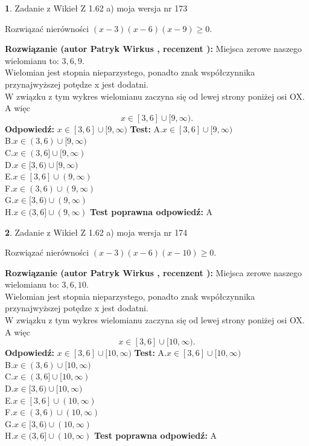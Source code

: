 \documentclass[12pt, a4paper]{article}
\theoremstyle{definition} %
\newtheorem{zad}{}
\newcommand{\zadStart}[1]{\begin{zad}#1\newline}
\newcommand{\zadStop}{\end{zad}}
\newcommand{\rozwStart}[2]{\noindent \textbf{Rozwiązanie (autor #1 , recenzent #2): }\newline}
\newcommand{\rozwStop}{\newline}
\newcommand{\odpStart}{\noindent \textbf{Odpowiedź:}\newline}
\newcommand{\odpStop}{\newline}
\newcommand{\testStart}{\noindent \textbf{Test:}\newline}
\newcommand{\testStop}{\newline}
\newcommand{\kluczStart}{\noindent \textbf{Test poprawna odpowiedź:}\newline}
\newcommand{\kluczStop}{\newline}
\begin{document}
\zadStart{Zadanie z Wikieł Z 1.62 a) moja wersja nr 173}

Rozwiązać nierówności $(x-3)(x-6)(x-9)\ge0$.
\zadStop
\rozwStart{Patryk Wirkus}{}
Miejsca zerowe naszego wielomianu to: $3, 6, 9$.\\
Wielomian jest stopnia nieparzystego, ponadto znak współczynnika przy\linebreak najwyższej potędze x jest dodatni.\\ W związku z tym wykres wielomianu zaczyna się od lewej strony poniżej osi OX. A więc $$x \in [3,6] \cup [9,\infty).$$
\rozwStop
\odpStart
$x \in [3,6] \cup [9,\infty)$
\odpStop
\testStart
A.$x \in [3,6] \cup [9,\infty)$\\
B.$x \in (3,6) \cup [9,\infty)$\\
C.$x \in (3,6] \cup [9,\infty)$\\
D.$x \in [3,6) \cup [9,\infty)$\\
E.$x \in [3,6] \cup (9,\infty)$\\
F.$x \in (3,6) \cup (9,\infty)$\\
G.$x \in [3,6) \cup (9,\infty)$\\
H.$x \in (3,6] \cup (9,\infty)$
\testStop
\kluczStart
A
\kluczStop



\zadStart{Zadanie z Wikieł Z 1.62 a) moja wersja nr 174}

Rozwiązać nierówności $(x-3)(x-6)(x-10)\ge0$.
\zadStop
\rozwStart{Patryk Wirkus}{}
Miejsca zerowe naszego wielomianu to: $3, 6, 10$.\\
Wielomian jest stopnia nieparzystego, ponadto znak współczynnika przy\linebreak najwyższej potędze x jest dodatni.\\ W związku z tym wykres wielomianu zaczyna się od lewej strony poniżej osi OX. A więc $$x \in [3,6] \cup [10,\infty).$$
\rozwStop
\odpStart
$x \in [3,6] \cup [10,\infty)$
\odpStop
\testStart
A.$x \in [3,6] \cup [10,\infty)$\\
B.$x \in (3,6) \cup [10,\infty)$\\
C.$x \in (3,6] \cup [10,\infty)$\\
D.$x \in [3,6) \cup [10,\infty)$\\
E.$x \in [3,6] \cup (10,\infty)$\\
F.$x \in (3,6) \cup (10,\infty)$\\
G.$x \in [3,6) \cup (10,\infty)$\\
H.$x \in (3,6] \cup (10,\infty)$
\testStop
\kluczStart
A
\kluczStop
\end{document}
